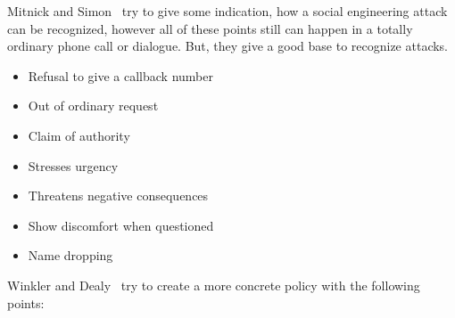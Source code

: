 Mitnick and Simon~\cite{mitnick2003} try to give some indication, how a social
engineering attack can be recognized, however all of these points still can
happen in a totally ordinary phone call or dialogue. But, they give a good
base to recognize attacks.

\begin{itemize}
  \item Refusal to give a callback number
  \item Out of ordinary request
  \item Claim of authority
  \item Stresses urgency
  \item Threatens negative consequences
  \item Show discomfort when questioned
  \item Name dropping
\end{itemize}

Winkler and Dealy~\cite{winkler1995} try to create a more concrete policy with
the following points:


